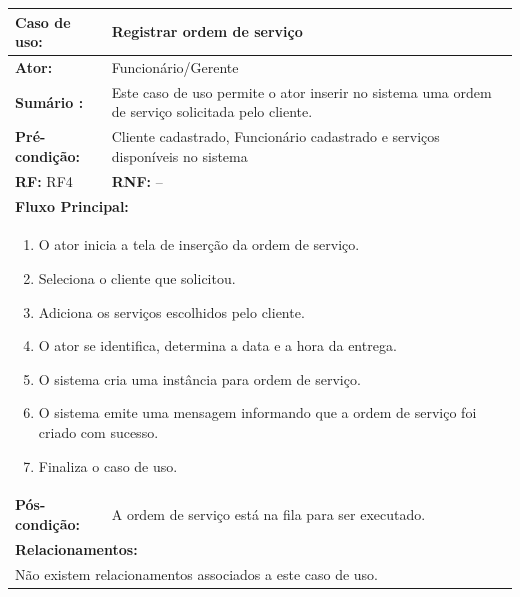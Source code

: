 \documentclass[
	12pt,				%
	openright,
	oneside,			%
	a4paper,			%
	chapter=TITLE,		%
	brazil				%
	]{abntex2}
\begin{document}
\begin{table}[h]
\centering
\begin{tabular}{|p{3cm}|p{3cm}|p{3cm}|p{3cm}|}
\hline
\textbf{Caso de uso:}             & \multicolumn{3}{p{9cm}|}{Registrar ordem de serviço}               						 \\ \hline
\textbf{Ator:}                 & \multicolumn{3}{p{9cm}|}{Funcionário/Gerente}                   						 \\ \hline
\textbf{Sumário :}                & \multicolumn{3}{p{9cm}|}{Este caso de uso permite o ator inserir no sistema uma %
													 ordem de serviço solicitada pelo cliente.}    	     				\\ \hline
\textbf{Pré-condição:}            & \multicolumn{3}{p{9cm}|}{ Cliente cadastrado, Funcionário cadastrado e serviços disponíveis no sistema }                 				    \\ \hline
\multicolumn{2}{|p{6cm}|}{\textbf{RF:} RF4 }                  & \multicolumn{2}{p{6cm}|}{\textbf{RNF:} -- }     	    \\ \hline
\multicolumn{4}{|p{12cm}|}{\textbf{Fluxo Principal:}}                                                					\\ \hline
\multicolumn{4}{|p{12cm}|}{%
\begin{enumerate}
  \item O ator inicia a tela de inserção da ordem de serviço.
  \item Seleciona o cliente que solicitou.
  \item Adiciona os serviços escolhidos pelo cliente.
  \item O ator se identifica, determina a data e a hora da entrega.
  \item O sistema cria uma instância para ordem de serviço.
  \item O sistema emite uma mensagem informando que a ordem de serviço foi criado com sucesso.
  \item Finaliza o caso de uso.
\end{enumerate}}                                                               				 							\\ \hline
\textbf{Pós-condição: }  & \multicolumn{3}{p{9cm}|}{A ordem de serviço está na fila para ser executado.}		\\ \hline
\multicolumn{4}{|p{12cm}|}{\textbf{Relacionamentos:}}                                        								\\ \hline
\multicolumn{4}{|p{12cm}|}{Não existem relacionamentos associados a este caso de uso.}                                  \\ \hline
\end{tabular}
\end{table}
\end{document}
